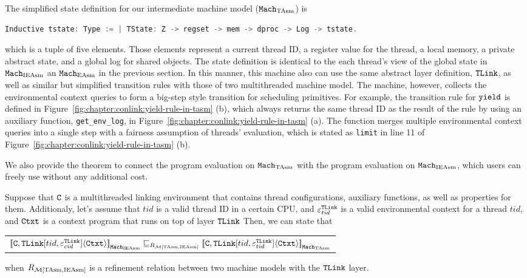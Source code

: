 The simplified state definition for our intermediate machine model (${\mathrm{\texttt{Mach}}}_{\mathrm{TAsm}}$) is
\begin{lstlisting}[language=C]
Inductive tstate: Type := | TState: Z -> regset -> mem -> dproc -> Log -> tstate.
\end{lstlisting}
which is a tuple of five elements. 
Those elements represent a current thread ID, 
a register value for the thread, a local memory, a private abstract state, and a global log for shared objects. 
The state definition is identical to the each thread's view of the global state in ${\mathrm{\texttt{Mach}}}_{\mathrm{IEAsm}}$ an ${\mathrm{\texttt{Mach}}}_{\mathrm{EAsm}}$ in the previous section. 
In this manner,
this machine also can use the same abstract layer definition, ${{\mathrm{\texttt{TLink}}}}$, 
as well as similar but simplified transition rules with those of two multithreaded machine model.
The machine, however,
 collects the environmental context queries to form a big-step style transition for scheduling primitives. 
 For example, 
 the transition rule for ${\mathrm{\texttt{yield}}}$ is defined in Figure~\ref{fig:chapter:conlink:yield-rule-in-tasm} (b),
 which always returns the same thread ID as the result of the rule 
 by using 
 an auxiliary function, \lstinline$get_env_log$, in  Figure~\ref{fig:chapter:conlink:yield-rule-in-tasm} (a).
 The function   merges multiple environmental context queries into a single step with a fairness assumption
 of threads' evaluation, which is stated as \lstinline$limit$ in line 11 of  Figure~\ref{fig:chapter:conlink:yield-rule-in-tasm} (b).

We also provide 
the theorem to connect the program evaluation on ${\mathrm{\texttt{Mach}}}_{\mathrm{TAsm}}$
with the program evaluation on ${\mathrm{\texttt{Mach}}}_{\mathrm{IEAsm}}$,
which users can freely use without any additional cost.

\begin{lemma}
\label{lemma:chapter:conlink:ieasm-refines-tasm}
Suppose that ${{\mathrm{\texttt{C}}}}$ is a multithreaded linking environment that contains thread configurations, auxiliary functions, as well as properties for them. 
Additionaly, let's assume that 
 $tid$ is a valid thread ID in a certain CPU,
and 
 ${\varepsilon}^{{{\mathrm{\texttt{TLink}}}}}_{tid}$ is a valid
environmental context for a thread $tid$, 
and ${\mathrm{\texttt{Ctxt}}}$ is a
 context program that runs on top of layer ${{\mathrm{\texttt{TLink}}}}$
 Then, we can state that
 \begin{center}
\begin{tabular}{c}
${[\![{{{\mathrm{\texttt{C}}}}, {{\mathrm{\texttt{TLink}}}}[tid, {\varepsilon}^{{{\mathrm{\texttt{TLink}}}}}_{cid}]} \langle {{\mathrm{\texttt{Ctxt}}}} \rangle]\!]}_{{\mathrm{\texttt{Mach}}}_{\mathrm{IEAsm}}} \sqsubseteq_{R_{\mathcal{M}{[\mathrm{TAsm}, \mathrm{IEAsm}]}}} {[\![{{{\mathrm{\texttt{C}}}}, {{\mathrm{\texttt{TLink}}}}[tid, {\varepsilon}^{{{\mathrm{\texttt{TLink}}}}}_{tid}]} \langle {{\mathrm{\texttt{Ctxt}}}} \rangle]\!]}_{{\mathrm{\texttt{Mach}}}_{\mathrm{TAsm}}}$\\
\end{tabular}
\end{center}
when $R_{\mathcal{M}{[\mathrm{TAsm}, \mathrm{IEAsm}]}}$ is a refinement relation between two machine models with the  ${{\mathrm{\texttt{TLink}}}}$ layer.
\end{lemma}

